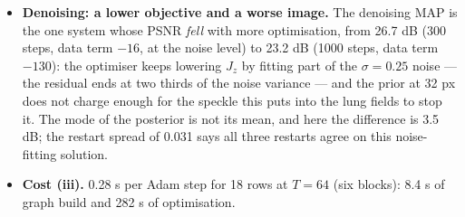 \documentclass[11pt]{article}
\begin{document}
\begin{itemize}
        inpainting) and 20--25 (box inpainting) against the prior's typical
        $\sqrt{TD} = 32$: the latent MAP sits far inside the typical set,
        most so where the data constrain least, exactly as in step 11.
  \item \textbf{Denoising: a lower objective and a worse image.} The
        denoising MAP is the one system whose PSNR \emph{fell} with more
        optimisation, from 26.7 dB (300 steps, data term $-16$, at the noise
        level) to 23.2 dB (1000 steps, data term $-130$): the optimiser
        keeps lowering $J_z$ by fitting part of the $\sigma = 0.25$ noise
        --- the residual ends at two thirds of the noise variance --- and the
        prior at 32 px does not charge enough for the speckle this puts into
        the lung fields to stop it. The mode of the posterior is not its
        mean, and here the difference is 3.5 dB; the restart spread of 0.031
        says all three restarts agree on this noise-fitting solution.
  \item \textbf{Cost (iii).} 0.28 s per Adam step for 18 rows at $T = 64$
        (six blocks): 8.4 s of graph build and 282 s of optimisation.
\end{itemize}
\end{document}
